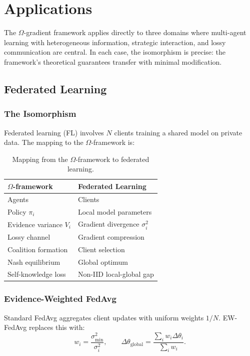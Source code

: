 \chapter{Applications}\label{ch:applications}

The $\Omega$-gradient framework applies directly to three domains where multi-agent learning with heterogeneous information, strategic interaction, and lossy communication are central. In each case, the isomorphism is precise: the framework's theoretical guarantees transfer with minimal modification.


\section{Federated Learning}\label{sec:app-fl}

\subsection{The Isomorphism}

Federated learning (FL) \citep{mcmahan2017fedavg} involves $N$ clients training a shared model on private data. The mapping to the $\Omega$-framework is:

\begin{table}[h]
\centering
\begin{tabular}{ll}
\toprule
$\Omega$-framework & Federated Learning \\
\midrule
Agents & Clients \\
Policy $\pi_i$ & Local model parameters \\
Evidence variance $V_i$ & Gradient divergence $\sigma_i^2$ \\
Lossy channel & Gradient compression \\
Coalition formation & Client selection \\
Nash equilibrium & Global optimum \\
Self-knowledge loss & Non-IID local-global gap \\
\bottomrule
\end{tabular}
\caption{Mapping from the $\Omega$-framework to federated learning.}
\end{table}

\subsection{Evidence-Weighted FedAvg}

Standard FedAvg aggregates client updates with uniform weights $1/N$. EW-FedAvg replaces this with:
\begin{equation}
    w_i = \frac{\sigma_{\min}^2}{\sigma_i^2}, \qquad
    \Delta\theta_{\text{global}} = \frac{\sum_i w_i \Delta\theta_i}{\sum_i w_i}.
\end{equation}

